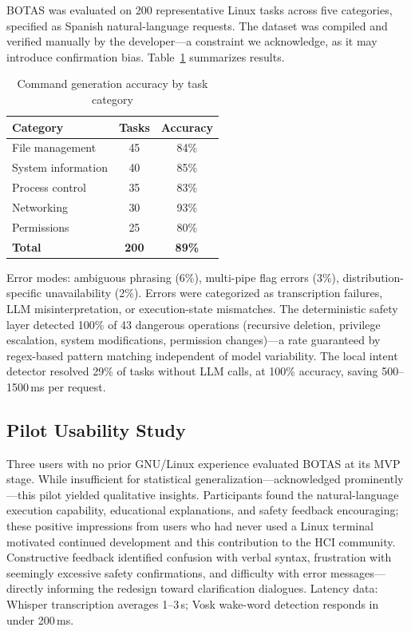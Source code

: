 \documentclass[12pt]{article}
\begin{document}
BOTAS was evaluated on 200 representative Linux tasks across five categories,
specified as Spanish natural-language requests. The dataset was compiled and
verified manually by the developer---a constraint we acknowledge, as it may
introduce confirmation bias. Table~\ref{tab:accuracy} summarizes results.

\begin{table}[h]
\caption{Command generation accuracy by task category}
\label{tab:accuracy}
\centering
\begin{tabular}{lcc}
\toprule
\textbf{Category} & \textbf{Tasks} & \textbf{Accuracy} \\
\midrule
File management     & 45 & 84\% \\
System information  & 40 & 85\% \\
Process control     & 35 & 83\% \\
Networking          & 30 & 93\% \\
Permissions         & 25 & 80\% \\
\midrule
\textbf{Total}      & \textbf{200} & \textbf{89\%} \\
\bottomrule
\end{tabular}
\end{table}

Error modes: ambiguous phrasing (6\%), multi-pipe flag errors (3\%),
distribution-specific unavailability (2\%). Errors were categorized as
transcription failures, LLM misinterpretation, or execution-state mismatches.
The deterministic safety layer detected 100\% of 43 dangerous operations
(recursive deletion, privilege escalation, system modifications, permission
changes)---a rate guaranteed by regex-based pattern matching independent of model
variability. The local intent detector resolved 29\% of tasks without LLM calls,
at 100\% accuracy, saving 500--1500\,ms per request.

\subsection{Pilot Usability Study}
\label{subsec:usability}

Three users with no prior GNU/Linux experience evaluated BOTAS at its MVP stage.
While insufficient for statistical generalization---acknowledged
prominently---this pilot yielded qualitative insights. Participants found the
natural-language execution capability, educational explanations, and safety
feedback encouraging; these positive impressions from users who had never used a
Linux terminal motivated continued development and this contribution to the HCI
community. Constructive feedback identified confusion with verbal syntax,
frustration with seemingly excessive safety confirmations, and difficulty with
error messages---directly informing the redesign toward clarification dialogues.
Latency data: Whisper transcription averages 1--3\,s; Vosk wake-word detection
responds in under 200\,ms.
\end{document}

